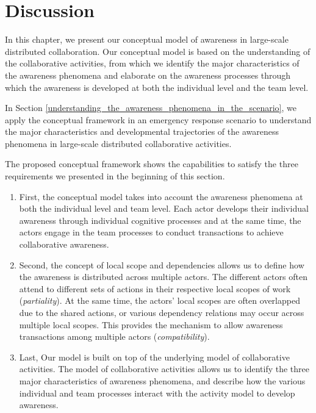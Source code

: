 \section{Discussion} %
\label{sec:discussion}
In this chapter, we present our conceptual model of awareness in large-scale distributed collaboration. Our conceptual model is based on the understanding of the collaborative activities, from which we identify the major characteristics of the awareness phenomena and elaborate on the awareness processes through which the awareness is developed at both the individual level and the team level.

In Section \ref{understanding_the_awareness_phenomena_in_the_scenario}, we apply the conceptual framework in an emergency response scenario to understand the major characteristics and developmental trajectories of the awareness phenomena in large-scale distributed collaborative activities. 

The proposed conceptual framework shows the capabilities to satisfy the three requirements we presented in the beginning of this section.
\begin{enumerate}
	\item First, the conceptual model takes into account the awareness phenomena at both the individual level and team level. Each actor develops their individual awareness through individual cognitive processes and at the same time, the actors engage in the team processes to conduct transactions to achieve collaborative awareness.  
	\item Second, the concept of local scope and dependencies allows us to define how the awareness is distributed across multiple actors. The different actors often attend to different sets of actions in their respective local scopes of work (\emph{partiality}). At the same time, the actors' local scopes are often overlapped due to the shared actions, or various dependency relations may occur across multiple local scopes. This provides the mechanism to allow awareness transactions among multiple actors (\emph{compatibility}).
	\item Last, Our model is built on top of the underlying model of collaborative activities. The model of collaborative activities allows us to identify the three major characteristics of awareness phenomena, and describe how the various individual and team processes interact with the activity model to develop awareness.
\end{enumerate}




 

